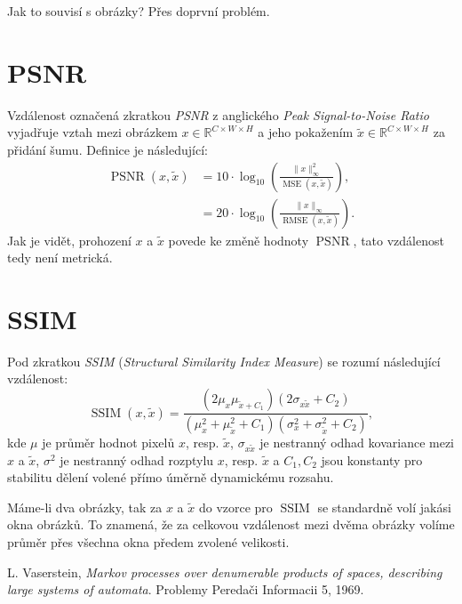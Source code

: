 \documentclass[czech]{article}
\begin{document}
Jak to souvisí s obrázky?
Přes doprvní problém.

\section{PSNR}

Vzdálenost označená zkratkou \emph{PSNR} z anglického \emph{Peak Signal-to-Noise Ratio}
vyjadřuje vztah mezi obrázkem $x \in \mathbb{R}^{C \times W \times H}$
a jeho pokažením $\tilde{x} \in \mathbb{R}^{C \times W \times H}$ za přidání šumu.
Definice je následující:
\begin{align}
    \operatorname{PSNR}(x, \tilde{x}) &= 10 \cdot \operatorname{log}_{10} \left( \frac{\|x\|_{\infty}^2}{\operatorname{MSE}(x, \tilde{x})} \right), \\
    &= 20 \cdot \operatorname{log}_{10} \left( \frac{\|x\|_{\infty}}{\operatorname{RMSE}(x, \tilde{x})} \right).
\end{align}
Jak je vidět, prohození $x$ a $\tilde{x}$ povede ke změně hodnoty $\operatorname{PSNR}$, tato vzdálenost tedy není metrická.

\section{SSIM}

Pod zkratkou \emph{SSIM} (\emph{Structural Similarity Index Measure})
se rozumí následující vzdálenost:
\begin{equation}
    \operatorname{SSIM}(x, \tilde{x}) = \frac{(2 \mu_x \mu_{\tilde{x} + C_1})(2 \sigma_{x \tilde{x}} + C_2)}{(\mu_x^2 + \mu_{\tilde{x}}^2 + C_1)(\sigma_x^2 + \sigma_{\tilde{x}}^2 + C_2)},
\end{equation}
kde $\mu$ je průměr hodnot pixelů $x$, resp. $\tilde{x}$,
$\sigma_{x \tilde{x}}$ je nestranný odhad kovariance mezi $x$ a $\tilde{x}$,
$\sigma^2$ je nestranný odhad rozptylu $x$, resp. $\tilde{x}$
a $C_1, C_2$ jsou konstanty pro stabilitu dělení volené přímo úměrně dynamickému rozsahu.

Máme-li dva obrázky, tak za $x$ a $\tilde{x}$ do vzorce pro $\operatorname{SSIM}$ se standardně volí jakási okna obrázků.
To znamená, že za celkovou vzdálenost mezi dvěma obrázky volíme průměr přes všechna okna předem zvolené velikosti.


\begin{thebibliography}{1}

 L. Vaserstein,
\emph{Markov processes over denumerable products of spaces, describing large systems of automata}.
Problemy Peredači Informacii 5, 1969.

\end{thebibliography}
\end{document}
